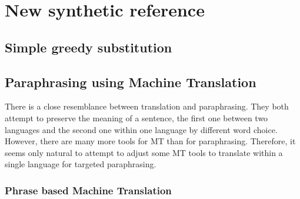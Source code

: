 \documentclass[11pt]{article}
\begin{document}



\section{New synthetic reference}

\subsection{Simple greedy substitution}

\subsection{Paraphrasing using Machine Translation}
There is a close resemblance between translation and paraphrasing. They both 
attempt to preserve the meaning of a sentence, the first one between two languages 
and the second one within one language by different word choice. \cite{madnani:2010} 
However, there are many more tools for MT than for paraphrasing. Therefore, it 
seems only natural to attempt to adjust some MT tools to translate within a 
single language for targeted paraphrasing. 

\subsubsection{Phrase based Machine Translation}
\end{document}
